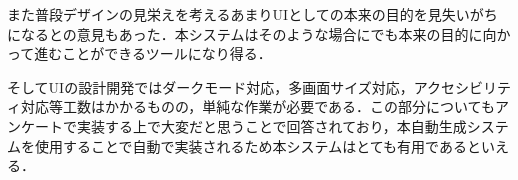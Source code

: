 また普段デザインの見栄えを考えるあまりUIとしての本来の目的を見失いがちになるとの意見もあった．本システムはそのような場合にでも本来の目的に向かって進むことができるツールになり得る．

そしてUIの設計開発ではダークモード対応，多画面サイズ対応，アクセシビリティ対応等工数はかかるものの，単純な作業が必要である．この部分についてもアンケートで実装する上で大変だと思うことで回答されており，本自動生成システムを使用することで自動で実装されるため本システムはとても有用であるといえる．





















